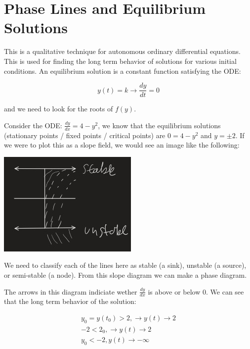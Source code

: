\section{}
\section{Phase Lines and Equilibrium Solutions}

  This is a qualitative technique for autonomous ordinary differential equations. This is used for finding the long term behavior of solutions for various initial conditions. An equilibrium solution is a constant function satisfying the ODE:

  \begin{equation}
    y(t)=k\to\frac{dy}{dt}=0
  \end{equation}

  and we need to look for the roots of $f(y)$.

  \begin{problem}
    Consider the ODE: $\frac{dy}{dx}=4-y^2$, we know that the equilibrium solutions (stationary points / fixed points / critical points) are $0=4-y^2$ and $y=\pm2$.  If we were to plot this as a slope field, we would see an image like the following:
  
    \begin{center}
      \includegraphics{resource/images/2.7 Example 1.jpg}
    \end{center}

    We need to classify each of the lines here as stable (a sink), unstable (a source), or semi-stable (a node). From this slope diagram we can make a phase diagram.

      

    The arrows in this diagram indiciate wether $\frac{dy}{dx}$ is above or below $0$. We can see that the long term behavior of the solution:

    \begin{equation}
      \begin{aligned}
        y_0 = y(t_0) > 2,\to y(t)\to 2\\
        - 2 < 2_0,\to y(t)\to 2\\
        y_0 <- 2, y(t)\to -\infty\\
      \end{aligned}
    \end{equation}
  \end{problem}

